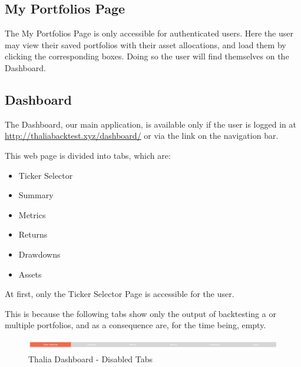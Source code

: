 \documentclass[main.tex]{subfiles}
\begin{document}
\subsection{My Portfolios Page}



The My Portfolios Page is only accessible for authenticated users. Here the user may view their saved portfolios with their asset allocations, and load them by clicking the corresponding boxes. Doing so the user will find themselves on the Dashboard. 



\subsection{Dashboard}



The Dashboard, our main application, is available only if the user is logged in at \url{http://thaliabacktest.xyz/dashboard/} or via the link on the navigation bar.

This web page is divided into tabs, which are:



\begin{itemize}

    \item Ticker Selector

    \item Summary

    \item Metrics

    \item Returns 

    \item Drawdowns

    \item Assets

\end{itemize}



At first, only the Ticker Selector Page is accessible for the user. 

This is because the following tabs show only the output of backtesting a or multiple portfolios, and as a consequence are, for the time being, empty.



\begin{figure}[H]

   \centering

   \includegraphics[width=\textwidth]{08Appendices/081User/081Pictures/disabled_tabs.png}

   \caption{Thalia Dashboard - Disabled Tabs}

   \label{thalia_disabled_tabs}

\end{figure}
\end{document}
